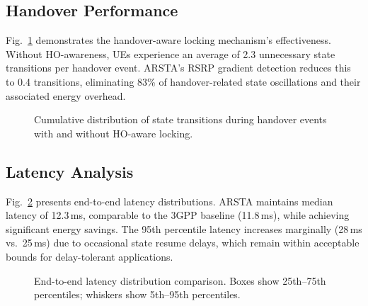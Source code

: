 \documentclass[conference]{IEEEtran}
\begin{document}
\subsection{Handover Performance}
\label{subsec:ho_results}

Fig.~\ref{fig:handover} demonstrates the handover-aware locking mechanism's effectiveness. Without HO-awareness, UEs experience an average of 2.3 unnecessary state transitions per handover event. ARSTA's RSRP gradient detection reduces this to 0.4 transitions, eliminating 83\% of handover-related state oscillations and their associated energy overhead.

\begin{figure}[t]
    \centering
    \caption{Cumulative distribution of state transitions during handover events with and without HO-aware locking.}
    \label{fig:handover}
\end{figure}

\subsection{Latency Analysis}
\label{subsec:latency_results}

Fig.~\ref{fig:latency} presents end-to-end latency distributions. ARSTA maintains median latency of 12.3\,ms, comparable to the 3GPP baseline (11.8\,ms), while achieving significant energy savings. The 95th percentile latency increases marginally (28\,ms vs.\ 25\,ms) due to occasional state resume delays, which remain within acceptable bounds for delay-tolerant applications.

\begin{figure}[t]
    \centering
    \caption{End-to-end latency distribution comparison. Boxes show 25th--75th percentiles; whiskers show 5th--95th percentiles.}
    \label{fig:latency}
\end{figure}
\end{document}
